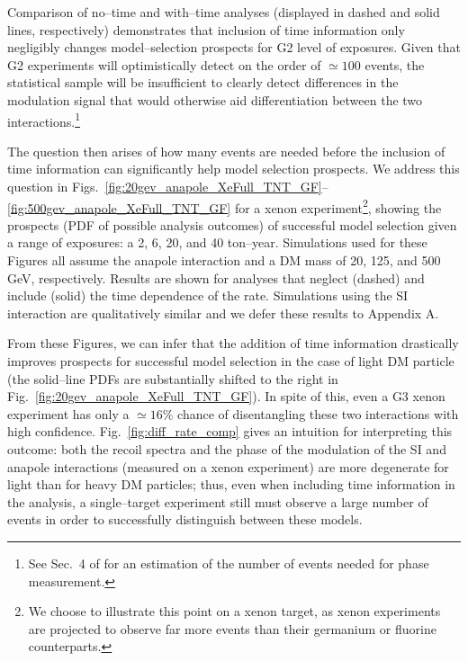 \documentclass[11pt]{article}
\newcommand{\Fig}[1]{Fig.~\ref{#1}} \newcommand{\Figs}[2]{Figs.~\ref{#1} and \ref{#2}}
\begin{document}
Comparison of no--time and with--time analyses (displayed in dashed and solid lines, respectively) demonstrates that inclusion of time information only negligibly changes model--selection prospects for G2 level of exposures. Given that G2 experiments will optimistically detect on the order of $\simeq 100$ events, the statistical sample will be insufficient to clearly detect differences in the modulation signal that would otherwise aid differentiation between the two interactions.\footnote{See Sec.~4 of \cite{DelNobile:2015nua} for an estimation of the number of events needed for phase measurement. }

The question then arises of how many events are needed before the inclusion of time information can significantly help model selection prospects. We address this question in Figs.~\ref{fig:20gev_anapole_XeFull_TNT_GF}--\ref{fig:500gev_anapole_XeFull_TNT_GF} for a xenon experiment\footnote{We choose to illustrate this point on a xenon target, as xenon experiments are projected to observe far more events than their germanium or fluorine counterparts.}, showing the prospects (PDF of possible analysis outcomes) of successful model selection given a range of exposures: a 2, 6, 20, and 40 ton--year. Simulations used for these Figures all assume the anapole interaction and a DM mass of 20, 125, and 500 GeV, respectively. Results are shown for analyses that neglect (dashed) and include (solid) the time dependence of the rate. Simulations using the SI interaction are qualitatively similar and we defer these results to Appendix A.

From these Figures, we can infer that the addition of time information drastically improves prospects for successful model selection in the case of light DM particle (the solid--line PDFs are substantially shifted to the right in \Fig{fig:20gev_anapole_XeFull_TNT_GF}). In spite of this, even a G3 xenon experiment has only a $\simeq 16\%$ chance of disentangling these two interactions with high confidence. \Fig{fig:diff_rate_comp} gives an intuition for interpreting this outcome: both the recoil spectra and the phase of the modulation of the SI and anapole interactions (measured on a xenon experiment) are more degenerate for light than for heavy DM particles; thus, even when including time information in the analysis, a single--target experiment still must observe a large number of events in order to successfully distinguish between these models.
\end{document}
